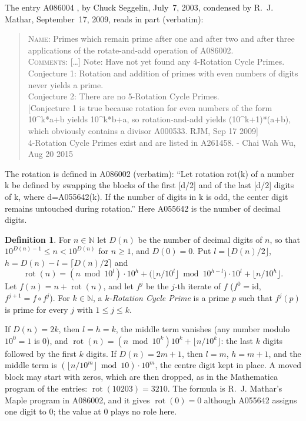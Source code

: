 \documentclass[11pt]{amsart}
\theoremstyle{plain}
\theoremstyle{definition}
\newtheorem{definition}[theorem]{Definition}
\newcommand{\N}{\mathbb{N}}
\DeclareMathOperator{\rot}{rot}
\newcommand{\nd}{D}
\begin{document}
The entry A086004 \cite{A086004}, by Chuck Seggelin, July~7, 2003, condensed by R.~J. Mathar, September~17, 2009, reads in part (verbatim):
\begin{quote}\raggedright
\textsc{Name}: Primes which remain prime after one and after two and after three applications of the rotate-and-add operation of A086002.\\[2pt]
\textsc{Comments}: [\dots] Note: Have not yet found any 4-Rotation Cycle Primes.\\
Conjecture 1: Rotation and addition of primes with even numbers of digits never yields a prime.\\
Conjecture 2: There are no 5-Rotation Cycle Primes.\\
{[}Conjecture 1 is true because rotation for even numbers of the form 10\^{}k*a+b yields 10\^{}k*b+a, so rotation-and-add yields (10\^{}k+1)*(a+b), which obviously contains a divisor A000533. RJM, Sep 17 2009{]}\\
4-Rotation Cycle Primes exist and are listed in A261458. - Chai Wah Wu, Aug 20 2015
\end{quote}
The rotation is defined in A086002 \cite{A086002} (verbatim): ``Let rotation rot(k) of a number k be defined by swapping the blocks of the first [d/2] and of the last [d/2] digits of k, where d=A055642(k). If the number of digits in k is odd, the center digit remains untouched during rotation.'' Here A055642 \cite{A055642} is the number of decimal digits.

\begin{definition}\label{def:rot}
For $n\in\N$ let $\nd(n)$ be the number of decimal digits of $n$, so that $10^{\nd(n)-1}\le n<10^{\nd(n)}$ for $n\ge1$, and $\nd(0)=0$. Put $l=\lfloor \nd(n)/2\rfloor$, $h=\nd(n)-l=\lceil \nd(n)/2\rceil$ and
\[
  \rot(n)=(n\bmod 10^{l})\cdot10^{h}+\bigl(\lfloor n/10^{l}\rfloor\bmod 10^{h-l}\bigr)\cdot10^{l}+\lfloor n/10^{h}\rfloor .
\]
Let $f(n)=n+\rot(n)$, and let $f^j$ be the $j$-th iterate of $f$ ($f^0=\mathrm{id}$, $f^{j+1}=f\circ f^j$). For $k\in\N$, a \emph{$k$-Rotation Cycle Prime} is a prime $p$ such that $f^j(p)$ is prime for every $j$ with $1\le j\le k$.
\end{definition}

If $\nd(n)=2k$, then $l=h=k$, the middle term vanishes (any number modulo $10^0=1$ is $0$), and $\rot(n)=(n\bmod10^k)10^k+\lfloor n/10^k\rfloor$: the last $k$ digits followed by the first $k$ digits. If $\nd(n)=2m+1$, then $l=m$, $h=m+1$, and the middle term is $(\lfloor n/10^m\rfloor\bmod10)\cdot10^m$, the centre digit kept in place. A moved block may start with zeros, which are then dropped, as in the Mathematica program of the entries: $\rot(10203)=3210$. The formula is R.~J. Mathar's Maple program in A086002, and it gives $\rot(0)=0$ although A055642 assigns one digit to $0$; the value at $0$ plays no role here.
\end{document}
